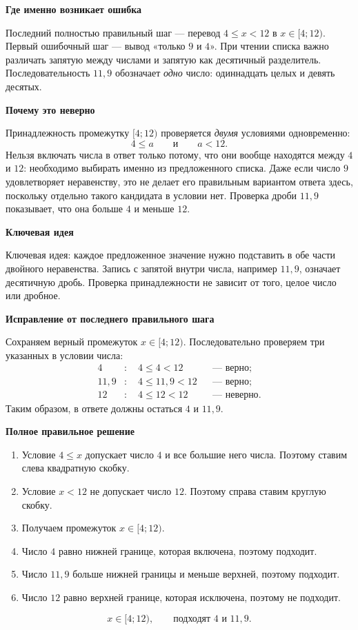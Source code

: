 \documentclass[12pt,a4paper]{article}
\newcommand{\reviewlabel}[1]{\medskip\noindent\textbf{#1}\par}
\begin{document}
\reviewlabel{Где именно возникает ошибка}
Последний полностью правильный шаг --- перевод $4\le x<12$ в $x\in[4;12)$. Первый ошибочный шаг --- вывод «только $9$ и $4$». При чтении списка важно различать запятую между числами и запятую как десятичный разделитель. Последовательность $11{,}9$ обозначает \emph{одно} число: одиннадцать целых и девять десятых.

\reviewlabel{Почему это неверно}
Принадлежность промежутку $[4;12)$ проверяется \emph{двумя} условиями одновременно:
\[
4\le a\qquad\text{и}\qquad a<12.
\]
Нельзя включать числа в ответ только потому, что они вообще находятся между $4$ и $12$: необходимо выбирать именно из предложенного списка. Даже если число $9$ удовлетворяет неравенству, это не делает его правильным вариантом ответа здесь, поскольку отдельно такого кандидата в условии нет. Проверка дроби $11{,}9$ показывает, что она больше $4$ и меньше $12$.

\reviewlabel{Ключевая идея}
\textcolor{blue!60!black}{Ключевая идея:} каждое предложенное значение нужно подставить в обе части двойного неравенства. Запись с запятой внутри числа, например $11{,}9$, означает десятичную дробь. Проверка принадлежности не зависит от того, целое число или дробное.

\reviewlabel{Исправление от последнего правильного шага}
Сохраняем верный промежуток $x\in[4;12)$. Последовательно проверяем три указанных в условии числа:
\begin{align*}
 4&:\quad 4\le 4<12 &&\text{--- верно};\\
 11{,}9&:\quad 4\le11{,}9<12 &&\text{--- верно};\\
 12&:\quad 4\le12<12 &&\text{--- неверно}.
\end{align*}
Таким образом, в ответе должны остаться $4$ и $11{,}9$.

\reviewlabel{Полное правильное решение}
\begin{enumerate}
\item Условие $4\le x$ допускает число $4$ и все большие него числа. Поэтому ставим слева квадратную скобку.
\item Условие $x<12$ не допускает число $12$. Поэтому справа ставим круглую скобку.
\item Получаем промежуток $x\in[4;12)$.
\item Число $4$ равно нижней границе, которая включена, поэтому подходит.
\item Число $11{,}9$ больше нижней границы и меньше верхней, поэтому подходит.
\item Число $12$ равно верхней границе, которая исключена, поэтому не подходит.
\end{enumerate}
\[
\boxed{x\in[4;12),\qquad\text{подходят }4\text{ и }11{,}9.}
\]
\end{document}
